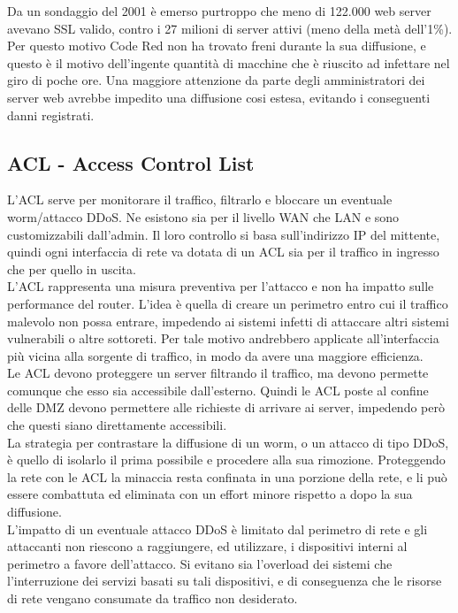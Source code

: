 Da un sondaggio del 2001 è emerso purtroppo che meno di 122.000 web server avevano SSL valido, contro i 27 milioni di server attivi (meno della metà dell’1\%). Per questo motivo Code Red non ha trovato freni durante la sua diffusione, e questo è il motivo dell’ingente quantità di macchine che è riuscito ad infettare nel giro di poche ore. Una maggiore attenzione da parte degli amministratori dei server web avrebbe impedito una diffusione cosi estesa, evitando i conseguenti danni registrati.\\
\subsection{ACL - Access Control List}
L’ACL serve per monitorare il traffico, filtrarlo e bloccare un eventuale worm/attacco DDoS. Ne esistono sia per il livello WAN che LAN e sono customizzabili dall’admin. Il loro controllo si basa sull’indirizzo IP del mittente, quindi ogni interfaccia di rete va dotata di un ACL sia per il traffico in ingresso che per quello in uscita.\\
L’ACL rappresenta una misura preventiva per l’attacco e non ha impatto sulle performance del router. L’idea è quella di creare un perimetro entro cui il traffico malevolo non possa entrare, impedendo ai sistemi infetti di attaccare altri sistemi vulnerabili o altre sottoreti. Per tale motivo andrebbero applicate all’interfaccia più vicina alla sorgente di traffico, in modo da avere una maggiore efficienza.\\
Le ACL devono proteggere un server filtrando il traffico, ma devono permette comunque che esso sia accessibile dall’esterno. Quindi le ACL poste al confine delle DMZ devono permettere alle richieste di arrivare ai server, impedendo però che questi siano direttamente accessibili.\\
La strategia per contrastare la diffusione di un worm, o un attacco di tipo DDoS, è quello di isolarlo il prima possibile e procedere alla sua rimozione. Proteggendo la rete con le ACL la minaccia resta confinata in una porzione della rete, e li può essere combattuta ed eliminata con un effort minore rispetto a dopo la sua diffusione.\\
L’impatto di un eventuale attacco DDoS è limitato dal perimetro di rete e gli attaccanti non riescono a raggiungere, ed utilizzare, i dispositivi interni al perimetro a favore dell’attacco. Si evitano sia l’overload dei sistemi che l’interruzione dei servizi basati su tali dispositivi, e di conseguenza che le risorse di rete vengano consumate da traffico non desiderato.\\
